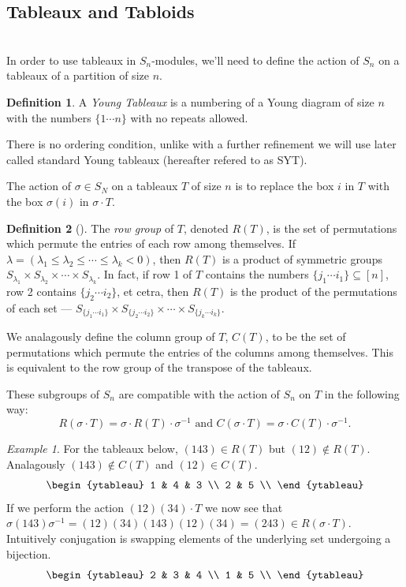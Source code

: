 \documentclass[12pt,twoside]{reedthesis}
\theoremstyle{plain}   %
\theoremstyle{definition}
\newtheorem{defn}{Definition}[section]
\theoremstyle{remark}
\newtheorem{ex}{Example}[section]
\numberwithin{equation}{section}
\begin{document}
  \subsection{Tableaux and Tabloids} \hfill\\
  In order to use tableaux in $S_n$-modules, we'll need to define the action of $S_n$ on a tableaux of a partition of size $n$.
  \begin{defn}
    A \emph{Young Tableaux} is a numbering of a Young diagram of size $n$ with the numbers $\{1 \cdots n\}$ with no
    repeats allowed. \par
    There is no ordering condition, unlike with a further refinement we will use later called standard Young tableaux (hereafter refered to as SYT).
    
  \end{defn}
  The action of $\sigma \in S_N$ on a tableaux $T$ of size $n$ is to replace the box $i$ in $T$ with the box $\sigma(i)$ in $\sigma \cdot T$.
  \begin{defn}[{\cite[Pg. 84]{fulton}}]
    The \emph{row group} of $T$, denoted $R(T)$, is the set of permutations which permute the entries of each row among themselves.
    If $\lambda = ( \lambda_1 \leq \lambda_2 \leq \cdots \leq \lambda_k < 0)$, then $R(T)$ is a product of symmetric groups
    $S_{\lambda_1} \times S_{\lambda_2} \times \cdots \times S_{\lambda_k}$.
    In fact, if row 1 of $T$ contains the numbers $\{ j_1 \cdots i_1\} \subseteq [n]$, row 2 contains $\{j_2 \cdots i_2 \}$, et cetra,
    then $R(T)$ is the product of the permutations of each set --- $S_{\{ j_1 \cdots i_1\}} \times S_{\{ j_2 \cdots i_2\}} \times \cdots \times S_{\{ j_k \cdots i_k\}}$.\par
    We analagously define the column group of $T$, $C(T)$, to be the set of permutations which permute the entries of the columns among themselves.
    This is equivalent to the row group of the transpose of the tableaux.
  \end{defn}
  These subgroups of $S_n$ are compatible with the action of $S_n$ on $T$ in the following way:
  \[ R(\sigma \cdot T) = \sigma \cdot R(T) \cdot \sigma^{-1} \text{ and } C(\sigma \cdot T) = \sigma \cdot C(T) \cdot \sigma^{-1}.\]
  \begin{ex}
    For the tableaux below,
    $(143) \in R(T)$ but $(12) \notin R(T)$.
    Analagously $(143) \notin C(T)$ and $(12) \in C(T)$.
    \[
      \begin{ytableau}
        1 & 4 & 3 \\
        2 & 5 \\
      \end{ytableau}
    \]
    If we perform the action $(12)(34) \cdot T$ we now see that $\sigma (143) \sigma^{-1} = (12)(34) (143) (12)(34) = (243) \in R(\sigma \cdot T)$.
    Intuitively conjugation is swapping elements of the underlying set undergoing a bijection.
    \[
      \begin{ytableau}
        2 & 3 & 4 \\
        1 & 5 \\
      \end{ytableau}
    \]
  \end{ex}
\end{document}
